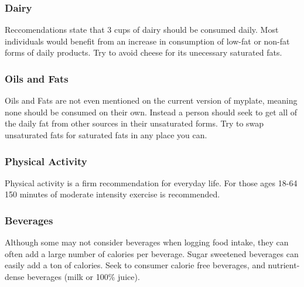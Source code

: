 \documentclass[letterpaper, 11pt]{article}
\begin{document}
\subsubsection{Dairy}
\label{sec:org8de5ec3}
Reccomendations state that 3 cups of dairy should be consumed daily. Most individuals would benefit from an increase in consumption of low-fat or non-fat forms of daily products. Try to avoid cheese for its unecessary saturated fats.\\
\subsubsection{Oils and Fats}
\label{sec:org14a440e}
Oils and Fats are not even mentioned on the current version of myplate, meaning none should be consumed on their own. Instead a person should seek to get all of the daily fat from other sources in their unsaturated forms. Try to swap unsaturated fats for saturated fats in any place you can.\\
\subsubsection{Physical Activity}
\label{sec:orgbfede0b}
Physical activity is a firm recommendation for everyday life. For those ages 18-64 150 minutes of moderate intensity exercise is recommended.\\
\subsubsection{Beverages}
\label{sec:org360e7df}
Although some may not consider beverages when logging food intake, they can often add a large number of calories per beverage. Sugar sweetened beverages can easily add a ton of calories. Seek to consumer calorie free beverages, and nutrient-dense beverages (milk or 100\% juice).\\
\end{document}
